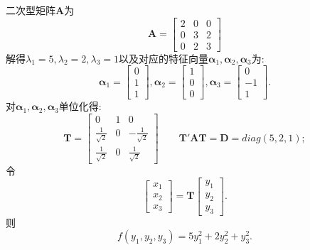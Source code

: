 \documentclass[lang=cn,11pt,normal]{elegantbook}
\renewcommand{\AA}{\boldsymbol{A}}
\newcommand{\DD}{\boldsymbol{D}}
\newcommand{\TT}{\boldsymbol{T}}
\begin{document}
	\begin{solution}
		二次型矩阵$\AA$为
		\begin{equation}
		\AA=
		\begin{bmatrix}
		2&0&0\\
		0&3&2\\
		0&2&3
		\end{bmatrix}
		\end{equation}
		解得$\lambda_1=5,\lambda_2=2,\lambda_3=1$以及对应的特征向量$\boldsymbol{\alpha}_1,\boldsymbol{\alpha}_2,\boldsymbol{\alpha}_3$为:
		\begin{equation}
		\boldsymbol{\alpha}_1=
		\begin{bmatrix}
		0\\1\\1
		\end{bmatrix},
		\boldsymbol{\alpha}_2=
		\begin{bmatrix}
		1\\0\\0
		\end{bmatrix},
		\boldsymbol{\alpha}_3=
		\begin{bmatrix}
		0\\-1\\1
		\end{bmatrix}.
		\end{equation}
		对$\boldsymbol{\alpha}_1,\boldsymbol{\alpha}_2,\boldsymbol{\alpha}_3$单位化得:
		\begin{equation}
		\TT=
		\begin{bmatrix}
		0&1&0\\
		\frac{1}{\sqrt{2}}&0&-\frac{1}{\sqrt{2}}\\
		\frac{1}{\sqrt{2}}&0&\frac{1}{\sqrt{2}}
		\end{bmatrix}
		\qquad\TT'\boldsymbol{AT}=\DD=diag(5,2,1);
		\end{equation}
		令
		\begin{equation}
		\begin{bmatrix}
		x_1\\x_2\\x_3
		\end{bmatrix}
		=
		\TT
		\begin{bmatrix}
		y_1\\y_2\\y_3
		\end{bmatrix}.
		\end{equation}
		则
		\begin{equation}
		f(y_1,y_2,y_3)=5y_1^2+2y_2^2+y_3^2.
		\end{equation}
	\end{solution}
\end{document}
